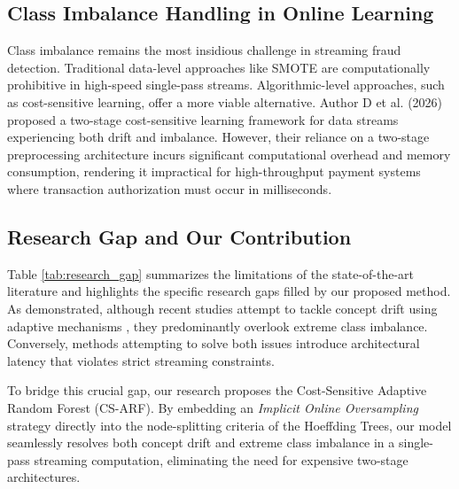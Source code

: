 \subsection{Class Imbalance Handling in Online Learning}
Class imbalance remains the most insidious challenge in streaming fraud detection. Traditional data-level approaches like SMOTE are computationally prohibitive in high-speed single-pass streams. Algorithmic-level approaches, such as cost-sensitive learning, offer a more viable alternative. Author D et al. (2026) \cite{ref_d} proposed a two-stage cost-sensitive learning framework for data streams experiencing both drift and imbalance. However, their reliance on a two-stage preprocessing architecture incurs significant computational overhead and memory consumption, rendering it impractical for high-throughput payment systems where transaction authorization must occur in milliseconds.

\subsection{Research Gap and Our Contribution}
Table \ref{tab:research_gap} summarizes the limitations of the state-of-the-art literature and highlights the specific research gaps filled by our proposed method. As demonstrated, although recent studies attempt to tackle concept drift using adaptive mechanisms \cite{ref_c}, they predominantly overlook extreme class imbalance. Conversely, methods attempting to solve both issues \cite{ref_d} introduce architectural latency that violates strict streaming constraints. 

To bridge this crucial gap, our research proposes the Cost-Sensitive Adaptive Random Forest (CS-ARF). By embedding an \textit{Implicit Online Oversampling} strategy directly into the node-splitting criteria of the Hoeffding Trees, our model seamlessly resolves both concept drift and extreme class imbalance in a single-pass streaming computation, eliminating the need for expensive two-stage architectures.

